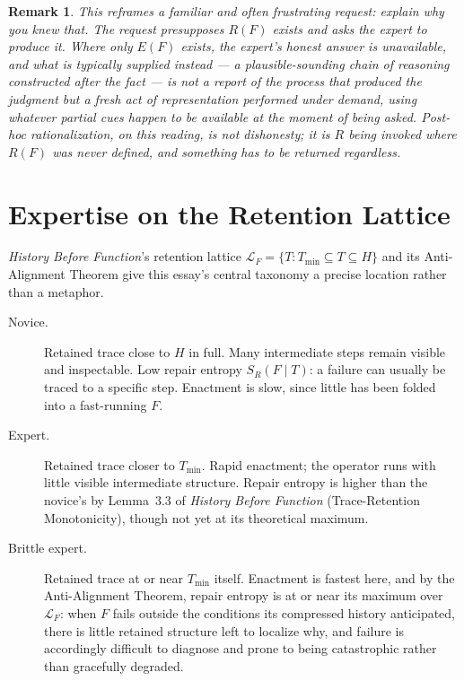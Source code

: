 \documentclass[11pt]{article}
\newtheorem*{remark}{Remark}
\begin{document}
\begin{remark}
This reframes a familiar and often frustrating request: \emph{explain why you knew that}. The request presupposes $R(F)$ exists and asks the expert to produce it. Where only $E(F)$ exists, the expert's honest answer is unavailable, and what is typically supplied instead — a plausible-sounding chain of reasoning constructed after the fact — is not a report of the process that produced the judgment but a fresh act of representation performed under demand, using whatever partial cues happen to be available at the moment of being asked. Post-hoc rationalization, on this reading, is not dishonesty; it is $R$ being invoked where $R(F)$ was never defined, and something has to be returned regardless.
\end{remark}

\section{Expertise on the Retention Lattice}

\emph{History Before Function}'s retention lattice $\mathcal{L}_F = \{T : T_{\min}\subseteq T\subseteq H\}$ and its Anti-Alignment Theorem give this essay's central taxonomy a precise location rather than a metaphor.

\begin{description}
\item[Novice.] Retained trace close to $H$ in full. Many intermediate steps remain visible and inspectable. Low repair entropy $S_R(F\mid T)$: a failure can usually be traced to a specific step. Enactment is slow, since little has been folded into a fast-running $F$.
\item[Expert.] Retained trace closer to $T_{\min}$. Rapid enactment; the operator runs with little visible intermediate structure. Repair entropy is higher than the novice's by Lemma~3.3 of \emph{History Before Function} (Trace-Retention Monotonicity), though not yet at its theoretical maximum.
\item[Brittle expert.] Retained trace at or near $T_{\min}$ itself. Enactment is fastest here, and by the Anti-Alignment Theorem, repair entropy is at or near its maximum over $\mathcal{L}_F$: when $F$ fails outside the conditions its compressed history anticipated, there is little retained structure left to localize why, and failure is accordingly difficult to diagnose and prone to being catastrophic rather than gracefully degraded.
\end{description}
\end{document}
